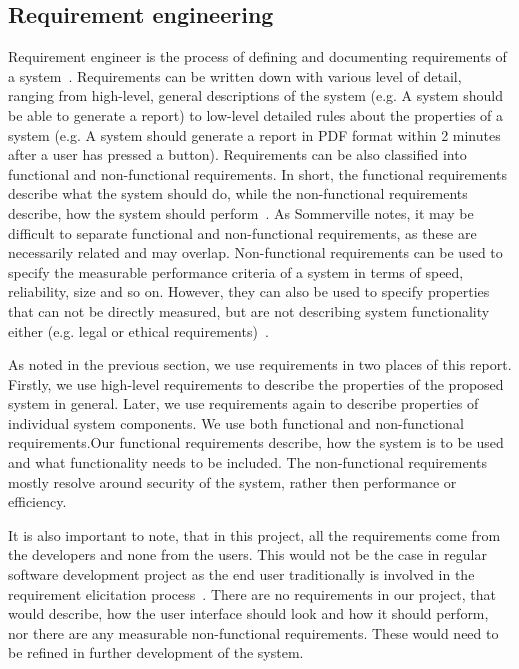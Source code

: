 \subsection{Requirement engineering}

Requirement engineer is the process of defining and documenting requirements of a system~\cite{Sommerville2011SoftwareEngineering}. Requirements can be written down with various level of detail, ranging from high-level, general descriptions of the system (e.g. A system should be able to generate a report) to low-level detailed rules about the properties of a system (e.g. A system should generate a report in PDF format within 2 minutes after a user has pressed a button). Requirements can be also classified into functional and non-functional requirements. In short, the functional requirements describe what the system should do, while the non-functional requirements describe, how the system should perform~\cite{Sommerville2011SoftwareEngineering}. As Sommerville notes, it may be difficult to separate functional and non-functional requirements, as these are necessarily related and may overlap. Non-functional requirements can be used to specify the measurable performance criteria of a system in terms of speed, reliability, size and so on. However, they can also be used to specify properties that can not be directly measured, but are not describing system functionality either (e.g. legal or ethical requirements)~\cite{Sommerville2011SoftwareEngineering}. 

As noted in the previous section, we use requirements in two places of this report. Firstly, we use high-level requirements to describe the properties of the proposed system in general. Later, we use requirements again to describe properties of individual system components. We use both functional and non-functional requirements.Our functional requirements describe, how the system is to be used and what functionality needs to be included. The non-functional requirements mostly resolve around security of the system, rather then performance or efficiency.

It is also important to note, that in this project, all the requirements come from the developers and none from the users. This would not be the case in regular software development project as the end user traditionally is involved in the requirement elicitation process~\cite{Kujala2005TheSuccess}. There are no requirements in our project, that would describe, how the user interface should look and how it should perform, nor there are any measurable non-functional requirements. These would need to be refined in further development of the system.